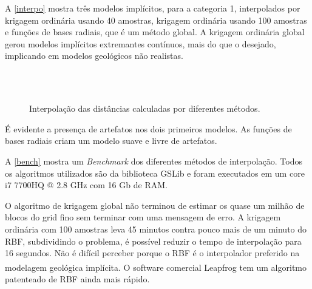 A \autoref{interpo} mostra três modelos implícitos, para a categoria 1, interpolados por krigagem ordinária usando 40 amostras, krigagem ordinária usando 100 amostras e funções de bases radiais, que é um método global. A krigagem ordinária global gerou modelos implícitos extremantes contínuos, mais do que o desejado, implicando em modelos geológicos não realistas. 

\begin{figure}[H] 
    \caption{Interpolação das distâncias calculadas por diferentes métodos.} \label{interpo}
     \centering
     \\
     \\
\end{figure}

É evidente a presença de artefatos nos dois primeiros modelos. As funções de bases radiais criam um modelo suave e livre de artefatos. 

A \autoref{bench} mostra um \textit{Benchmark} dos diferentes métodos de interpolação. Todos os algoritmos utilizados são da biblioteca GSLib e foram executados em um core i7 7700HQ @ 2.8 GHz com 16 Gb de RAM.

O algoritmo de krigagem global não terminou de estimar os quase um milhão de blocos do grid fino sem terminar com uma mensagem de erro. A krigagem ordinária com 100 amostras leva 45 minutos contra pouco mais de um minuto do RBF, subdividindo o problema, é possível reduzir o tempo de interpolação para 16 segundos. Não é difícil perceber porque o RBF é o interpolador preferido na modelagem geológica implícita. O software comercial Leapfrog \textsuperscript{\textregistered} tem um algoritmo patenteado de RBF ainda mais rápido.

